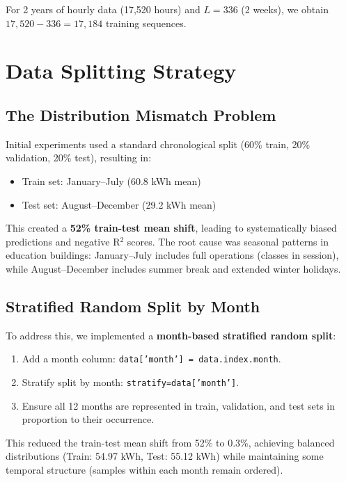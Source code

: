 \documentclass[12pt,a4paper]{report}
\begin{document}
For 2 years of hourly data (17,520 hours) and \(L=336\) (2 weeks), we obtain \(17,520 - 336 = 17,184\) training sequences.

\section{Data Splitting Strategy}

\subsection{The Distribution Mismatch Problem}

Initial experiments used a standard chronological split (60\% train, 20\% validation, 20\% test), resulting in:

\begin{itemize}
    \item Train set: January--July (60.8 kWh mean)
    \item Test set: August--December (29.2 kWh mean)
\end{itemize}

This created a \textbf{52\% train-test mean shift}, leading to systematically biased predictions and negative R$^2$ scores. The root cause was seasonal patterns in education buildings: January--July includes full operations (classes in session), while August--December includes summer break and extended winter holidays.

\subsection{Stratified Random Split by Month}

To address this, we implemented a \textbf{month-based stratified random split}:

\begin{enumerate}
    \item Add a month column: \texttt{data['month'] = data.index.month}.
    \item Stratify split by month: \texttt{stratify=data['month']}.
    \item Ensure all 12 months are represented in train, validation, and test sets in proportion to their occurrence.
\end{enumerate}

This reduced the train-test mean shift from 52\% to 0.3\%, achieving balanced distributions (Train: 54.97 kWh, Test: 55.12 kWh) while maintaining some temporal structure (samples within each month remain ordered).
\end{document}
